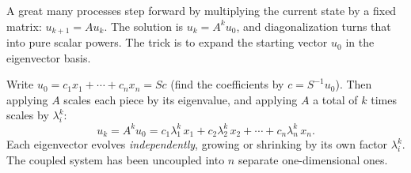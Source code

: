 A great many processes step forward by multiplying the current state by a fixed matrix: $u_{k+1}=Au_k$. The solution is $u_k=A^k u_0$, and diagonalization turns that into pure scalar powers. The trick is to expand the starting vector $u_0$ in the eigenvector basis.

Write $u_0 = c_1 x_1 + \cdots + c_n x_n = Sc$ (find the coefficients by $c=S^{-1}u_0$). Then applying $A$ scales each piece by its eigenvalue, and applying $A$ a total of $k$ times scales by $\lambda_i^k$:
\[
   u_k = A^k u_0 = c_1\lambda_1^k\,x_1 + c_2\lambda_2^k\,x_2 + \cdots + c_n\lambda_n^k\,x_n .
\]
Each eigenvector evolves \emph{independently}, growing or shrinking by its own factor $\lambda_i^k$. The coupled system has been uncoupled into $n$ separate one-dimensional ones.


